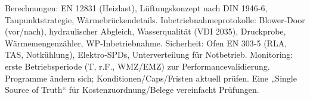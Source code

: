\markdownRendererInterblockSeparator
{}\markdownRendererUlBeginTight
\markdownRendererUlItem Berechnungen: EN 12831 (Heizlast), Lüftungskonzept nach DIN 1946‑6, Taupunktstrategie, Wärmebrückendetails.\markdownRendererUlItemEnd 
\markdownRendererUlItem Inbetriebnahmeprotokolle: Blower‑Door (vor/nach), hydraulischer Abgleich, Wasserqualität (VDI 2035), Druckprobe, Wärmemengenzähler, WP‑Inbetriebnahme.\markdownRendererUlItemEnd 
\markdownRendererUlItem Sicherheit: Ofen EN 303‑5 (RLA, TAS, Notkühlung), Elektro‑SPDs, Unterverteilung für Notbetrieb.\markdownRendererUlItemEnd 
\markdownRendererUlItem Monitoring: erste Betriebsperiode (T, r.F., WMZ/EMZ) zur Performancevalidierung.\markdownRendererUlItemEnd 
\markdownRendererUlEndTight \markdownRendererInterblockSeparator
{}
\markdownRendererSectionEnd \markdownRendererSectionBegin
{}\markdownRendererInterblockSeparator
{}\markdownRendererUlBeginTight
\markdownRendererUlItem Programme ändern sich; Konditionen/Caps/Fristen aktuell prüfen.\markdownRendererUlItemEnd 
\markdownRendererUlItem Eine „Single Source of Truth“ für Kostenzuordnung/Belege vereinfacht Prüfungen.\markdownRendererUlItemEnd 
\markdownRendererUlEndTight 
\markdownRendererSectionEnd 
\markdownRendererSectionEnd \markdownRendererDocumentEnd